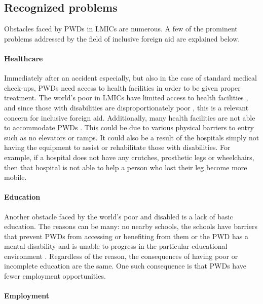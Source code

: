 \documentclass[a4paper]{article}
\begin{document}
\subsection{Recognized problems}

Obstacles faced by PWDs in LMICs are numerous. A few of the prominent problems
addressed by the field of inclusive foreign aid are explained below.

\paragraph{Healthcare}

Immediately after an accident especially, but also in the case of standard
medical check-ups, PWDs need access to health facilities in order to be given
proper treatment. The world's poor in LMICs have limited access to health
facilities \citep{peters2008poverty}, and since those with disabilities are
disproportionately poor \citep{mitra2018disability}, this is a relevant
concern for inclusive foreign aid. Additionally, many health facilities are
not able to accommodate PWDs \citep{drainoni2006cross}. This could be due to
various physical barriers to entry such as no elevators or ramps. It could
also be a result of the hospitals simply not having the equipment to assist or
rehabilitate those with disabilities. For example, if a hospital does not have
any crutches, prosthetic legs or wheelchairs, then that hospital is not able
to help a person who lost their leg become more mobile.

\paragraph{Education}

Another obstacle faced by the world’s poor and disabled is a lack of basic
education. The reasons can be many: no nearby schools, the schools have
barriers that prevent PWDs from accessing or benefiting from them or the PWD
has a mental disability and is unable to progress in the particular
educational environment \citep{ingstad2011disability}. Regardless of the
reason, the consequences of having poor or incomplete education are the same.
One such consequence is that PWDs have fewer employment opportunities.

\paragraph{Employment}
\end{document}
